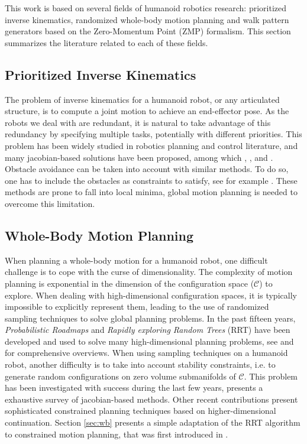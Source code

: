 \documentclass{article}
\begin{document}
This work is based on several fields of humanoid robotics
research: prioritized inverse kinematics, randomized  whole-body  motion
planning and walk pattern generators based on the Zero-Momentum
Point (ZMP) formalism. This section summarizes the literature related to each of 
these fields.

\subsection{Prioritized Inverse Kinematics}

The problem of inverse kinematics for a humanoid robot, or any articulated
structure, is to compute a joint motion to achieve an end-effector pose. As the
robots we deal with are redundant, it is natural to take advantage of
this redundancy by specifying multiple tasks, potentially with
different priorities. This problem has been widely studied in robotics
planning and control literature, and many jacobian-based solutions have been
proposed, among which 
\cite{nakamura1986iks}, \cite{siciliano1991gfm},
\cite{baerlocher1998tpf} and \cite{khatib2004wbd}.
Obstacle avoidance can be taken into account with similar methods. To
do so, one has to include the obstacles as  constraints to
satisfy, see for example \cite{kanehiro2008lca}.
These methods are prone to fall into local minima, global motion 
planning is needed to overcome this limitation.

\subsection{Whole-Body Motion Planning}

When  planning a  whole-body motion  for a  humanoid robot, one difficult
challenge is to cope with  the curse of dimensionality. The complexity
of   motion  planning  is   exponential  in   the  dimension   of  the
configuration  space ($\mathcal{C}$)  to explore.  When  dealing with
high-dimensional configuration  spaces, it is  typically impossible to
explicitly represent  them, leading to the use  of randomized sampling
techniques  to solve  global planning  problems. In  the  past fifteen
years,  \textit{Probabilistic Roadmaps} \cite{kavraki1996prp} and  
\textit{Rapidly exploring Random  Trees} (RRT) 
\cite{kuffner00rrtconnect}  have been  developed and  used to  solve many
high-dimensional   planning  problems, see \cite{Lav06} and \cite{choset2005prm} for comprehensive
overviews.
When  using  sampling  techniques  on  a humanoid  robot,  another difficulty
is to  take into  account stability  constraints,  i.e. to
generate  random  configurations   on  zero  volume  submanifolds  of
$\mathcal{C}$. This problem has been investigated with success during
the last few years, \cite{Berenson15032011} presents a exhaustive survey
of jacobian-based methods. Other recent contributions \cite{porta2012randomized}
present sophisticated constrained planning techniques based on higher-dimensional
continuation. Section \ref{sec:wb} presents a simple adaptation
of the RRT algorithm to constrained motion planning, that was first
introduced in \cite{dalibard09}.
\end{document}
